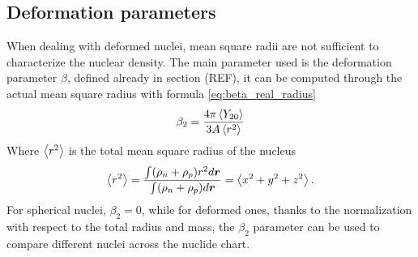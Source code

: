 \subsection{Deformation parameters}
When dealing with deformed nuclei, mean square radii are not sufficient to characterize the nuclear density. The main parameter used is the deformation parameter $\beta$, defined already in section (REF), it can be computed through the actual mean square radius with formula \ref{eq:beta_real_radius}
\begin{equation}
    \label{eq:beta_real_radius}
    \beta_2 = \frac{4\pi\expval{Y_{2 0}}}{3A\expval{r^2}}
\end{equation}
Where $\expval{r^2}$ is the total mean square radius of the nucleus 
\begin{equation}
    \expval{r^2} = \frac{\int (\rho_n + \rho_p )r^2 d\bm r}{\int (\rho_n + \rho_p )d\bm r} = \expval{x^2+y^2+z^2}.
\end{equation}
For spherical nuclei, $\beta_2 = 0$, while for deformed ones, thanks to the normalization with respect to the total radius and mass, the $\beta_2$ parameter can be used to compare different nuclei across the nuclide chart.